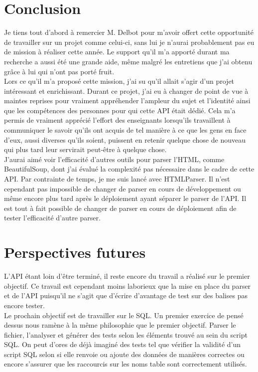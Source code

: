 \section{Conclusion}

Je tiens tout d'abord à remercier M. Delbot pour m'avoir offert cette opportunité de travailler sur un projet comme celui-ci, sans lui je n'aurai probablement pas eu de mission à réaliser cette année. Le support qu'il m'a apporté durant ma recherche a aussi été une grande aide, même malgré les entretiens que j'ai obtenu grâce à lui qui n'ont pas porté fruit.\\

Lors ce qu'il m'a proposé cette mission, j'ai su qu'il allait s'agir d'un projet intéressant et enrichissant. Durant ce projet, j'ai eu à changer de point de vue à maintes reprises pour vraiment appréhender l'ampleur du sujet et l'identité ainsi que les compétences des personnes pour qui cette API était dédié. Cela m'a permis de vraiment apprécié l'effort des enseignants lorsqu'ils travaillent à communiquer le savoir qu'ils ont acquis de tel manière à ce que les gens en face d'eux, aussi diverses qu'ils soient, puissent en retenir quelque chose de nouveau qui plus tard leur servirait peut-être à quelque chose.\\

J'aurai aimé voir l'efficacité d'autres outils pour parser l'HTML, comme BeautifulSoup, dont j'ai évalué la complexité pas nécessaire dans le cadre de cette API. Par contrainte de temps, je me suis lancé avec HTMLParser. Il n'est cependant pas impossible de changer de parser en cours de développement ou même encore plus tard après le déploiement ayant séparer le parser de l'API. Il est tout à fait possible de changer de parser en cours de déploiement afin de tester l’efficacité d'autre parser.\\

\section{Perspectives futures}

L'API étant loin d’être terminé, il reste encore du travail a réalisé sur le premier objectif. Ce travail est cependant moins laborieux que la mise en place du parser et de l'API puisqu'il ne s'agit que d'écrire d'avantage de test sur des balises pas encore tester.\\

Le prochain objectif est de travailler sur le SQL. Un premier exercice de pensé dessus nous ramène à la même philosophie que le premier objectif. Parser le fichier, l'analyser et générer des tests selon les éléments trouvé au sein du script SQL. On peut d'ores de déjà imaginé des tests tel que vérifier la validité d'un script SQL selon si elle renvoie ou ajoute des données de manières correctes ou encore s'assurer que les raccourcis sur les noms table sont correctement utilisés.\\

